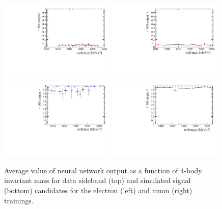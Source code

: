 \begin{figure}[h!]
\centering
\includegraphics[width=0.49\textwidth]{RKst/figs/Training/EE_wNB_vs_MPV_bkg.pdf}
\includegraphics[width=0.49\textwidth]{RKst/figs/Training/MM_wNB_vs_MPV_bkg.pdf}
\includegraphics[width=0.49\textwidth]{RKst/figs/Training/EE_wNB_vs_MPV_sgn.pdf}
\includegraphics[width=0.49\textwidth]{RKst/figs/Training/MM_wNB_vs_MPV_sgn.pdf}
\caption{Average value of neural network output as a function of 4-body invariant mass for data
sideband (top) and simulated signal (bottom) candidates for the electron (left) and muon (right) trainings.}
\label{fig:RKst_NNprofiles}
\end{figure}
%
%
